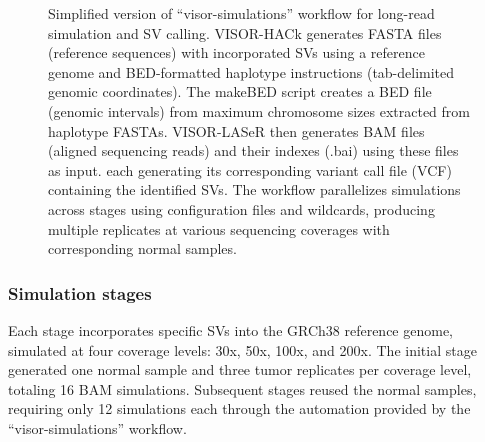 \begin{figure}[H]
    \caption[Simplified version of ``visor-simulations'' workflow for long-read 
    simulation and SV calling]{Simplified version of ``visor-simulations'' 
    workflow for long-read simulation and SV calling. VISOR-HACk generates FASTA 
    files (reference sequences) with incorporated SVs using a reference genome and 
    BED-formatted haplotype instructions (tab-delimited genomic coordinates). 
    The makeBED script creates a BED file (genomic intervals) from maximum 
    chromosome sizes extracted from haplotype FASTAs. VISOR-LASeR then generates 
    BAM files (aligned sequencing reads) and their indexes (.bai) using these 
    files as input. each generating its corresponding variant call file (VCF) 
    containing the identified SVs. The workflow parallelizes simulations 
    across stages using configuration files and wildcards, producing 
    multiple replicates at various sequencing coverages with corresponding 
    normal samples.}
    \label{fig:visor-sim}
\end{figure}

\subsubsection{Simulation stages}

Each stage incorporates specific SVs into the GRCh38 reference genome, simulated 
at four coverage levels: 30x, 50x, 100x, and 200x. The initial stage generated 
one normal sample and three tumor replicates per coverage level, totaling 16 BAM 
simulations. Subsequent stages reused the normal samples, requiring only 12 
simulations each through the automation provided by the ``visor-simulations'' 
workflow. 

